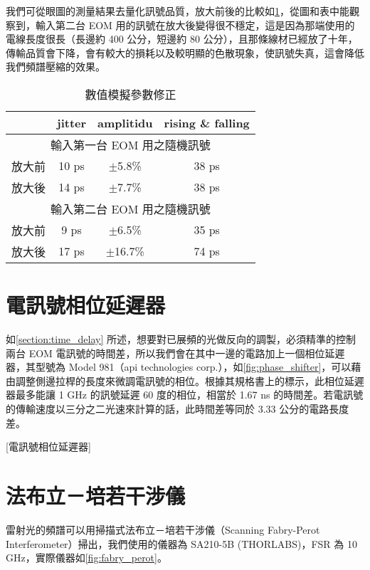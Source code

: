 \documentclass[class=NCU_thesis, crop=false]{standalone}
\begin{document}
我們可從眼圖的測量結果去量化訊號品質，放大前後的比較如\cref{tab:amplifier_compare}，從圖和表中能觀察到，輸入第二台 EOM 用的訊號在放大後變得很不穩定，這是因為那端使用的電線長度很長（長邊約 400 公分，短邊約 80 公分），且那條線材已經放了十年，傳輸品質會下降，會有較大的損耗以及較明顯的色散現象，使訊號失真，這會降低我們頻譜壓縮的效果。

\begin{table}[h]
    \centering
    \caption{數值模擬參數修正}
    \begin{tabular}{| c | c | c | c |}
\hline
         & jitter & amplitidu & rising \& falling
    \\ \hline
    \multicolumn{4}{|c|}{輸入第一台 EOM 用之隨機訊號}\\ \hline
    放大前 & 10 ps & $\pm$5.8\% & 38 ps\\ \hline
    放大後 & 14 ps & $\pm$7.7\% & 38 ps\\ \hline
    \multicolumn{4}{|c|}{輸入第二台 EOM 用之隨機訊號}\\ \hline
    放大前 & 9 ps & $\pm$6.5\% & 35 ps\\ \hline
    放大後 & 17 ps & $\pm$16.7\% & 74 ps\\ \hline
    \end{tabular}
    \label{tab:amplifier_compare}
\end{table}

\section{電訊號相位延遲器}
如\cref{section:time_delay} 所述，想要對已展頻的光做反向的調製，必須精準的控制兩台 EOM 電訊號的時間差，所以我們會在其中一邊的電路加上一個相位延遲器，其型號為 Model 981（api technologies corp.），如\cref{fig:phase_shifter}，可以藉由調整側邊拉桿的長度來微調電訊號的相位。根據其規格書上的標示，此相位延遲器最多能讓 1 GHz 的訊號延遲 60 度的相位，相當於 1.67 ns 的時間差。若電訊號的傳輸速度以三分之二光速來計算的話，此時間差等同於 3.33 公分的電路長度差。

[電訊號相位延遲器]


\section{法布立－培若干涉儀}
雷射光的頻譜可以用掃描式法布立－培若干涉儀（Scanning Fabry-Perot Interferometer）掃出，我們使用的儀器為 SA210-5B (THORLABS)，FSR 為 10 GHz，實際儀器如\cref{fig:fabry_perot}。
\end{document}

